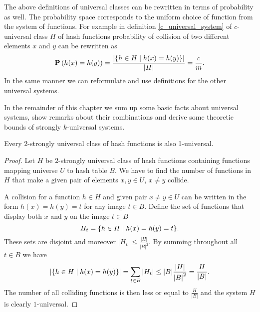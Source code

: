 The above definitions of universal classes can be rewritten in terms of probability as well. The probability space corresponds to the uniform choice of function from the system of functions. For example in definition \ref{c_universal_system} of $c$-universal class $H$ of hash functions probability of collision of two different elements $x$ and $y$ can be rewritten as
\[
	\mathbf{P}\left(h(x) = h(y)\right) = \frac{|\{h \in H \mid h(x) = h(y)\}|}{|H|} = \frac{c}{m} \text{.}
\]
In the same manner we can reformulate and use definitions for the other universal systems.

In the remainder of this chapter we sum up some basic facts about universal systems, show remarks about their combinations and derive some theoretic bounds of strongly $k$-universal systems.
\begin{remark}
Every $2$-strongly universal class of hash functions is also 1-universal.
\end{remark}
\begin{proof}
Let $H$ be $2$-strongly universal class of hash functions containing functions mapping universe $U$ to hash table $B$. We have to find the number of functions in $H$ that make a given pair of elements $x, y \in U$, $x \neq y$ collide. 

A collision for a function $h \in H$ and given pair $x \neq y \in U$ can be written in the form $h(x) = h(y) = t$ for any image $t \in B$. Define the set of functions that display both $x$ and $y$ on the image $t \in B$ \[ H_t = \lbrace h \in H \mid h(x) = h(y) = t \rbrace \textit{.} \] These sets are disjoint and moreover $|H_t| \leq \frac{|H|}{{|B|}^{2}}$. By summing throughout all $t \in B$ we have
\begin{displaymath}
|\lbrace h \in H \mid h(x) = h(y) \rbrace | = \displaystyle \sum_{t \in B} |H_t| \leq |B| \frac{|H|}{{|B|}^{2}} = \frac{H}{|B|}\textit{.}
\end{displaymath}
The number of all colliding functions is then less or equal to $\frac{H}{|B|}$ and the system $H$ is clearly $1$-universal.
\end{proof}

